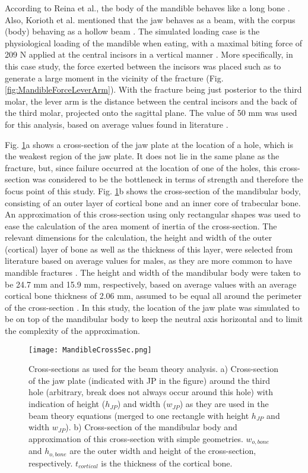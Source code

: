 According to Reina et al., the body of the mandible behaves like a long bone \cite{Reina}. Also, Korioth et al. mentioned that the jaw behaves as a beam, with the corpus (body) behaving as a hollow beam \cite{Korioth}. The simulated loading case is the physiological loading of the mandible when eating, with a maximal biting force of 209 N applied at the central incisors \cite{Mansour} in a vertical manner \cite{Reina}. More specifically, in this case study, the force exerted between the incisors was placed such as to generate a large moment in the vicinity of the fracture (Fig. \ref{fig:MandibleForceLeverArm}). With the fracture being just posterior to the third molar, the lever arm is the distance between the central incisors and the back of the third molar, projected onto the sagittal plane. The value of 50 mm was used for this analysis, based on average values found in literature \cite{akinbami}.

Fig. \ref{fig:MandibleCrossSec}a shows a cross-section of the jaw plate at the location of a hole, which is the weakest region of the jaw plate. It does not lie in the same plane as the fracture, but, since failure occurred at the location of one of the holes, this cross-section was considered to be the bottleneck in terms of strength and therefore the focus point of this study. Fig. \ref{fig:MandibleCrossSec}b shows the cross-section of the mandibular body, consisting of an outer layer of cortical bone and an inner core of trabecular bone. An approximation of this cross-section using only rectangular shapes was used to ease the calculation of the area moment of inertia of the cross-section. The relevant dimensions for the calculation, the height and width of the outer (cortical) layer of bone as well as the thickness of this layer, were selected from literature based on average values for males, as they are more common to have mandible fractures \cite{Bhavik}. The height and width of the mandibular body were taken to be 24.7 mm and 15.9 mm, respectively, based on average values \cite{Sittitavornwong, More} with an average cortical bone thickness of 2.06 mm, assumed to be equal all around the perimeter of the cross-section \cite{Katranji}. In this study, the location of the jaw plate was simulated to be on top of the mandibular body to keep the neutral axis horizontal and to limit the complexity of the approximation.

\begin{figure}[h]
    \centering
    \texttt{[image: MandibleCrossSec.png]}
    \caption[Cross-sections as used for the beam theory analysis]{Cross-sections as used for the beam theory analysis. a) Cross-section of the jaw plate (indicated with JP in the figure) around the third hole (arbitrary, break does not always occur around this hole) with indication of height ($h_{JP}$) and width ($w_{JP}$) as they are used in the beam theory equations (merged to one rectangle with height $h_{JP}$ and width $w_{JP}$). b) Cross-section of the mandibular body and approximation of this cross-section with simple geometries. $w_{o,bone}$ and $h_{o,bone}$ are the outer width and height of the cross-section, respectively. $t_{cortical}$ is the thickness of the cortical bone.}
    \label{fig:MandibleCrossSec}
\end{figure}

